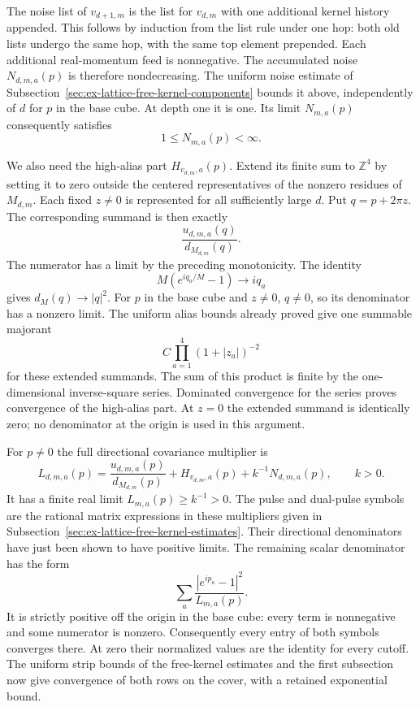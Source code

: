 The noise list of $v_{d+1,m}$ is the list for $v_{d,m}$ with one
additional kernel history appended. This follows by induction from the list
rule under one hop: both old lists undergo the same hop, with the
same top element prepended. Each additional real-momentum feed is
nonnegative. The accumulated noise $N_{d,m,a}(p)$ is therefore
nondecreasing. The uniform noise estimate of
Subsection~\ref{sec:ex-lattice-free-kernel-components} bounds it above,
independently of $d$ for $p$ in the base cube. At depth one it is
one. Its limit $N_{m,a}(p)$ consequently satisfies
\[
                            1\le N_{m,a}(p)<\infty.
\]

We also need the high-alias part $H_{v_{d,m},a}(p)$. Extend its
finite sum to $\mathbb Z^4$ by setting it to zero outside the centered
representatives of the nonzero residues of $M_{d,m}$. Each fixed
$z\ne0$ is represented for all sufficiently large $d$. Put
$q=p+2\pi z$. The corresponding summand is then exactly
\[
                         \frac{u_{d,m,a}(q)}{d_{M_{d,m}}(q)}.
\]
The numerator has a limit by the preceding monotonicity. The
identity
\[
 M(e^{iq_a/M}-1)\longrightarrow iq_a
\]
gives $d_M(q)\to |q|^2$. For $p$ in the base cube and $z\ne0$,
$q\ne0$, so its denominator has a nonzero limit. The uniform alias
bounds already proved give one summable majorant
\[
       C\prod_{a=1}^4(1+|z_a|)^{-2}
\]
for these extended summands. The sum of this product is finite by
the one-dimensional inverse-square series. Dominated convergence
for the series proves convergence of the high-alias part. At $z=0$
the extended summand is identically zero; no denominator at the
origin is used in this argument.

For $p\ne0$ the full directional covariance multiplier is
\[
 L_{d,m,a}(p)=
 \frac{u_{d,m,a}(p)}{d_{M_{d,m}}(p)}
       +H_{v_{d,m},a}(p)+k^{-1}N_{d,m,a}(p),\qquad k>0.
\]
It has a finite real limit $L_{m,a}(p)\ge k^{-1}>0$.
The pulse and dual-pulse symbols are the rational matrix expressions
in these multipliers given in
Subsection~\ref{sec:ex-lattice-free-kernel-estimates}.
Their directional denominators have just been shown to have positive
limits. The remaining scalar denominator has the form
\[
        \sum_a\frac{|e^{ip_a}-1|^2}{L_{m,a}(p)}.
\]
It is strictly positive off the origin in the base cube: every term
is nonnegative and some numerator is nonzero. Consequently every
entry of both symbols converges there. At zero their normalized
values are the identity for every cutoff. The uniform strip bounds
of the free-kernel estimates and the first subsection now give
convergence of both rows on the cover, with a retained exponential
bound.

